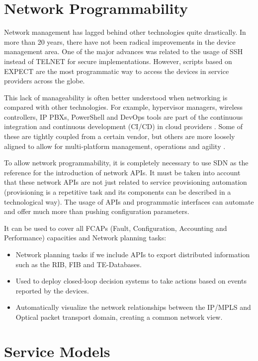 \documentclass[a4paper,fleqn]{cas-dc}
\begin{document}
\section{Network Programmability}
\label{section:net}

Network management has lagged behind other technologies quite drastically. In more than 20 years, there have not been radical improvements in the device management area. One of the major advances was related to the usage of SSH instead of TELNET for secure implementations. However, scripts based on EXPECT are the most programmatic way to access the devices in service providers across the globe.

This lack of manageability is often better understood when networking is compared with other technologies. For example, hypervisor managers, wireless controllers, IP PBXs, PowerShell and DevOps tools are part of the continuous integration and continuous development (CI/CD) in cloud providers \cite{mittal2017cloud,demchenko2016zerotouch}. Some of these are tightly coupled from a certain vendor, but others are more loosely aligned to allow for multi-platform management, operations and agility \cite{edelman2018network}.

To allow network programmability, it is completely necessary to use SDN as the reference for the introduction of network APIs. It must be taken into account that these network APIs are not just related to service provisioning automation (provisioning is a repetitive task and its components can be described in a technological way). The usage of APIs and programmatic interfaces can automate and offer much more than pushing configuration parameters. 

It can be used to cover all FCAPs (Fault, Configuration, Accounting and Performance) capacities and Network planning tasks:
\begin{itemize}
    \item Network planning tasks if we include APIs to export distributed information such as the RIB, FIB and TE-Databases.
    \item Used to deploy closed-loop decision systems to take actions based on events reported by the devices.
    \item Automatically visualize the network relationships between the IP/MPLS and Optical packet transport domain, creating a common network view. 
\end{itemize}

\section{Service Models}
\label{section:models}
\end{document}
